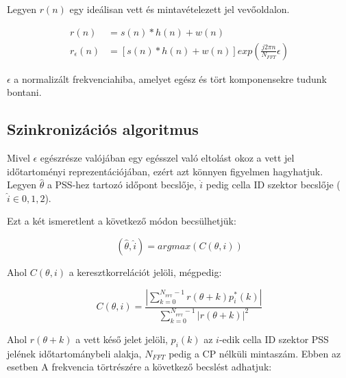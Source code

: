 Legyen $ r(n) $ egy ideálisan vett és mintavételezett jel vevőoldalon.

\begin{align}
    r(n) &= s(n) \ast h(n) + w(n)\\
    r_{\epsilon} (n) &= [s(n) \ast h(n) + w(n)] exp(\frac{j 2 \pi n }{N_{FFT}} \epsilon) \label{eq:frekhiba}
\end{align}

$\epsilon$ a normalizált frekvenciahiba, amelyet egész és tört komponensekre tudunk bontani.

\subsection{Szinkronizációs algoritmus}

Mivel $\epsilon$ egészrésze valójában egy egésszel való eltolást okoz a vett jel időtartoményi reprezentációjában, ezért azt könnyen figyelmen hagyhatjuk.
Legyen $ \hat{\theta} $ a PSS-hez tartozó időpont becslője, $ \hat{i} $ pedig cella ID szektor becslője ($ \hat{i} \in {0, 1, 2} $).

Ezt a két ismeretlent a következő módon becsülhetjük:

\begin{equation}
    (\hat{\theta},  \hat{i}) = arg max (C(\theta, i))
\end{equation}

Ahol $ C(\theta, i) $ a keresztkorrelációt jelöli, mégpedig:


\begin{equation}
    C(\theta ,i)=\frac { \left |{\sum \limits _{k=0}^{N_{_{\text {FFT}}}-1}{r(\theta +k) p_{i}^{*}(k)}}\right |}{\sum \limits _{k=0}^{N_{_{\text {FFT}}}-1}{ \left |{r(\theta +k)}\right |^{2}}}
\end{equation} 

Ahol $r(\theta + k)$ a vett késő jelet jelöli, $ p_i (k) $ az $i$-edik cella ID szektor PSS jelének időtartománybeli alakja, $N_{FFT}$ pedig a CP nélküli mintaszám.
Ebben az esetben A frekvencia törtrészére a következő becslést adhatjuk:


